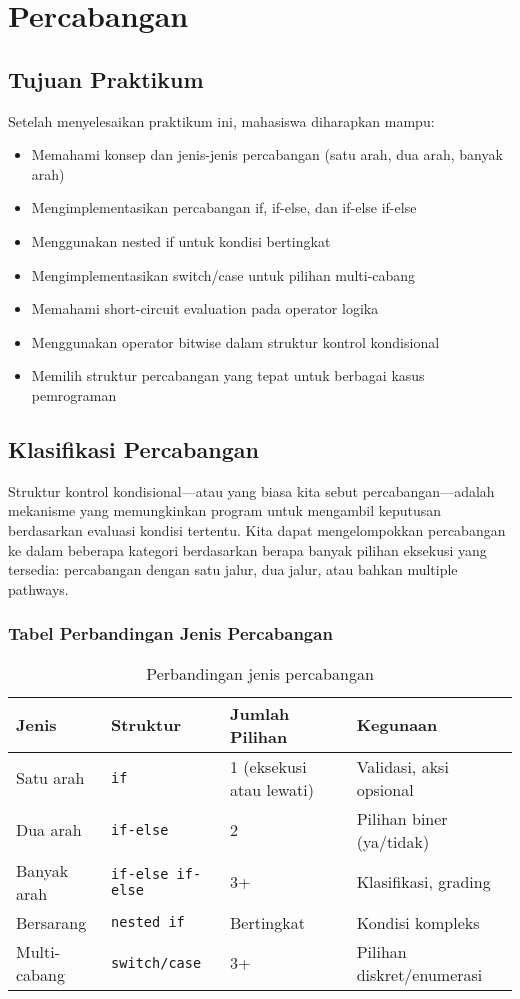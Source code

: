 \documentclass[../main.tex]{subfiles}
\begin{document}
\chapter{Percabangan}

\section*{Tujuan Praktikum}
Setelah menyelesaikan praktikum ini, mahasiswa diharapkan mampu:
\begin{itemize}
  \item Memahami konsep dan jenis-jenis percabangan (satu arah, dua arah, banyak arah)
  \item Mengimplementasikan percabangan if, if-else, dan if-else if-else
  \item Menggunakan nested if untuk kondisi bertingkat
  \item Mengimplementasikan switch/case untuk pilihan multi-cabang
  \item Memahami short-circuit evaluation pada operator logika
  \item Menggunakan operator bitwise dalam struktur kontrol kondisional
  \item Memilih struktur percabangan yang tepat untuk berbagai kasus pemrograman
\end{itemize}

\section{Klasifikasi Percabangan}
Struktur kontrol kondisional—atau yang biasa kita sebut percabangan—adalah mekanisme yang memungkinkan program untuk mengambil keputusan berdasarkan evaluasi kondisi tertentu. Kita dapat mengelompokkan percabangan ke dalam beberapa kategori berdasarkan berapa banyak pilihan eksekusi yang tersedia: percabangan dengan satu jalur, dua jalur, atau bahkan multiple pathways.

\subsection{Tabel Perbandingan Jenis Percabangan}
\begin{table}[H]
  \centering
  \caption{Perbandingan jenis percabangan}
  \begin{tabular}{@{}llll@{}}
    \toprule
    Jenis & Struktur & Jumlah Pilihan & Kegunaan \\
    \midrule
    Satu arah & \texttt{if} & 1 (eksekusi atau lewati) & Validasi, aksi opsional \\
    Dua arah & \texttt{if-else} & 2 & Pilihan biner (ya/tidak) \\
    Banyak arah & \texttt{if-else if-else} & 3+ & Klasifikasi, grading \\
    Bersarang & \texttt{nested if} & Bertingkat & Kondisi kompleks \\
    Multi-cabang & \texttt{switch/case} & 3+ & Pilihan diskret/enumerasi \\
    \bottomrule
  \end{tabular}
\end{table}
\end{document}

